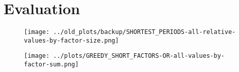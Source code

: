 
\chapter{Evaluation}
\label{ch:Evaluation}

\begin{figure}[h]
	\texttt{[image: ../old\_plots/backup/SHORTEST\_PERIODS-all-relative-values-by-factor-size.png]}
\end{figure}
\begin{figure}
	\texttt{[image: ../plots/GREEDY\_SHORT\_FACTORS-OR-all-values-by-factor-sum.png]}
\end{figure}


